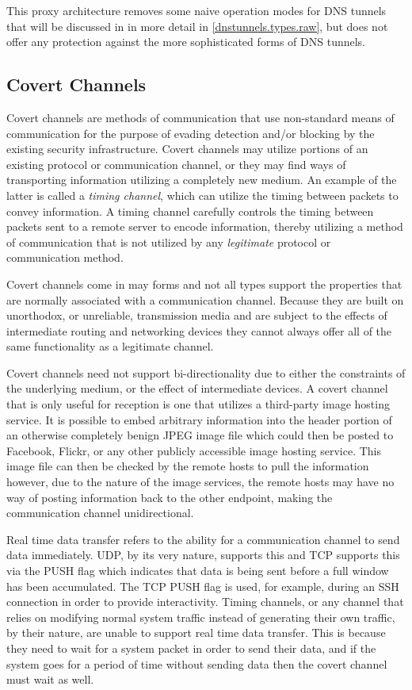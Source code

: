 \documentclass[12pt]{article}
\theoremstyle{remark}
\theoremstyle{definition}
\theoremstyle{definition}
\theoremstyle{definition}
\begin{document}
This proxy architecture removes some naive operation modes for DNS tunnels
that will be discussed in in more detail in \ref{dnstunnels.types.raw}, but does 
not offer any protection against the more sophisticated forms of DNS tunnels.

\subsection{Covert Channels}

Covert channels are methods of communication that use non-standard means of
communication for the purpose of evading detection and/or blocking by the
existing security infrastructure. Covert channels may utilize
portions of an existing protocol or communication channel, or they may find
ways of transporting information utilizing a completely new medium. An example
of the latter is called a \emph{timing channel}, which can utilize the timing
between packets to convey information. A timing channel carefully controls the
timing between packets sent to a remote server to encode information, thereby
utilizing a method of communication that is not utilized by any
\emph{legitimate} protocol or communication method.

Covert channels come in may forms and not all types support the properties that
are normally associated with a communication channel. Because they are built on
unorthodox, or unreliable, transmission media and are subject to the effects of
intermediate routing and networking devices they cannot always offer all of the
same functionality as a legitimate channel.

Covert channels need not support bi-directionality due
to either the constraints of the underlying medium, or the effect of
intermediate devices. A covert channel that is only useful for reception is one
that utilizes a third-party image hosting service. It is possible to embed
arbitrary information into the header portion of an otherwise completely benign
JPEG image file which could then be posted to Facebook, Flickr, or any other
publicly accessible image hosting service. This image file can then be checked
by the remote
hosts to pull the information however, due to the nature of the image services,
the remote
hosts may have no
way of posting information back to the other endpoint, making the
communication channel unidirectional.

Real time data transfer refers to the ability
for a communication channel to send data immediately. UDP, by its very nature,
supports this and TCP supports this via the PUSH flag which indicates that data
is being sent before a full window has been accumulated. The TCP PUSH flag
is used, for example, during an SSH connection in order to provide
interactivity. Timing channels, or any channel that relies on modifying normal
system traffic instead of generating their own traffic, by their nature, are
unable to support real time data transfer. This is because they need to wait for 
a system packet in order to send their data, and if the system goes for a period 
of time without sending data then the covert channel must wait as well.
\end{document}
